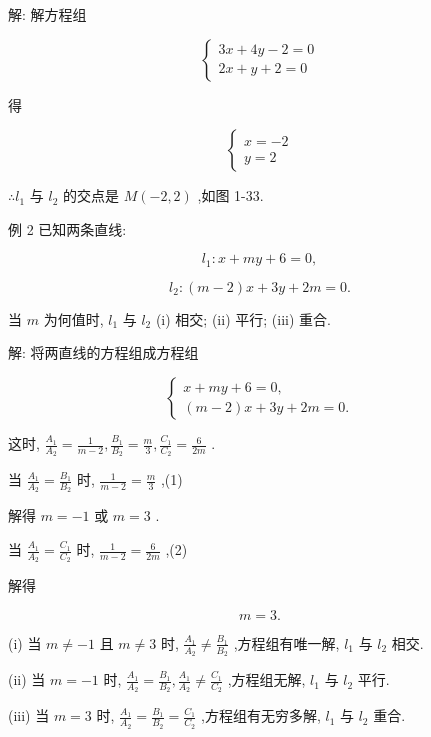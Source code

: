 \documentclass[lang=cn,newtx,10.5pt,scheme=chinese]{elegantbook}
\begin{document}
解: 解方程组

\[
  \left\{ \begin{array}{l} {3x} + {4y} - 2 = 0 \\ {2x} + y + 2 = 0 \end{array}\right.
\]

得

\[
  \left\{ \begin{array}{l} x = - 2 \\ y = 2 \end{array}\right.
\]

\(\therefore {l}_{1}\) 与 \({l}_{2}\) 的交点是 \(M\left( {-2,2}\right)\) ,如图 1-33.

例 2 已知两条直线:

\[
    {l}_{1} : x + {my} + 6 = 0,
\]

\[
    {l}_{2} : \left( {m - 2}\right) x + {3y} + {2m} = 0.
\]

当 \(m\) 为何值时, \({l}_{1}\) 与 \({l}_{2}\) (i) 相交; (ii) 平行; (iii) 重合.

解: 将两直线的方程组成方程组

\[
  \left\{ \begin{array}{l} x + {my} + 6 = 0, \\ \left( {m - 2}\right) x + {3y} + {2m} = 0. \end{array}\right.
\]

这时, \(\frac{{A}_{1}}{{A}_{2}} = \frac{1}{m - 2},\frac{{B}_{1}}{{B}_{2}} = \frac{m}{3},\frac{{C}_{1}}{{C}_{2}} = \frac{6}{2m}\) .

当 \(\frac{{A}_{1}}{{A}_{2}} = \frac{{B}_{1}}{{B}_{2}}\) 时, \(\frac{1}{m - 2} = \frac{m}{3}\) ,(1)

解得 \(m = - 1\) 或 \(m = 3\) .

当 \(\frac{{A}_{1}}{{A}_{2}} = \frac{{C}_{1}}{{C}_{2}}\) 时, \(\frac{1}{m - 2} = \frac{6}{2m}\) ,(2)

解得

\[
  m = 3\text{.}
\]

(i) 当 \(m \neq - 1\) 且 \(m \neq 3\) 时, \(\frac{{A}_{1}}{{A}_{2}} \neq \frac{{B}_{1}}{{B}_{2}}\) ,方程组有唯一解, \({l}_{1}\) 与 \({l}_{2}\) 相交.

(ii) 当 \(m = - 1\) 时, \(\frac{{A}_{1}}{{A}_{2}} = \frac{{B}_{1}}{{B}_{2}},\frac{{A}_{1}}{{A}_{2}} \neq \frac{{C}_{1}}{{C}_{2}}\) ,方程组无解, \({l}_{1}\) 与 \({l}_{2}\) 平行.

(iii) 当 \(m = 3\) 时, \(\frac{{A}_{1}}{{A}_{2}} = \frac{{B}_{1}}{{B}_{2}} = \frac{{C}_{1}}{{C}_{2}}\) ,方程组有无穷多解, \({l}_{1}\) 与 \({l}_{2}\) 重合.
\end{document}
